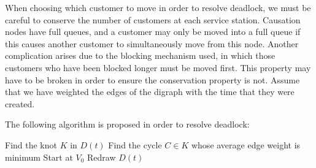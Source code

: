 \documentclass{article}
\begin{document}
When choosing which customer to move in order to resolve deadlock, we must be careful to conserve the number of customers at each service station.
Causation nodes have full queues, and a customer may only be moved into a full queue if this causes another customer to simultaneously move from this node.
Another complication arises due to the blocking mechanism used, in which those customers who have been blocked longer must be moved first.
This property may have to be broken in order to ensure the conservation property is not.
Assume that we have weighted the edges of the digraph with the time that they were created. %

The following algorithm is proposed in order to resolve deadlock:

\begin{algorithm}[H]
    \DontPrintSemicolon
    Find the knot $K$ in $D(t)$\;
    Find the cycle $C \in K$ whose average edge weight is minimum\;
    Start at $V_0$\;
    Redraw $D(t)$\;
\end{algorithm}





\end{document}
